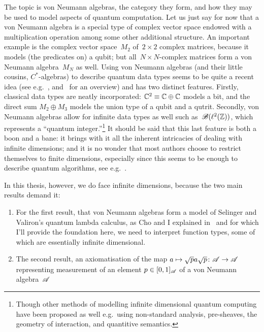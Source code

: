 \documentclass[b5paper]{book}
\begin{document}
\begin{parsec}{10}
\begin{point}{10}
The topic is von Neumann algebras,
the category they form,
and how they may be used
to model aspects of quantum computation.
Let us just say for now that a von Neumann algebra
is a special type of complex vector
space endowed with
a multiplication operation among some other additional structure.
An important example is the complex vector space~$M_2$
of~$2\times 2$ complex matrices,
because it models (the predicates on) a qubit;
but all~$N\times N$-complex matrices form a von Neumann algebra~$M_N$ as well.
Using von Neumann algebras
(and their little cousins, $C^*$-algebras) 
to describe quantum data types 
seems to be quite a recent idea
(see e.g.~\cite{jacobs2013block,rennela2015operator,furber2013kleisli}, 
	and~\cite{cho2016semantics} for an overview)
and has two distinct features.
Firstly, classical data types
are neatly incorporated:
$\mathbb{C}^2 \equiv \mathbb{C}\oplus \mathbb{C}$
models a bit,
and the direct sum $M_2\oplus M_3$
models the union type of a qubit and a qutrit.
Secondly,
von Neumann algebras
allow for infinite data types as well
	such as~$\mathscr{B}(\ell^2(\mathbb{Z}))$,
which represents a ``quantum integer.''\footnote{Though
	other methods of modelling infinite dimensional
	quantum computing have been proposed as well
	e.g.~using non-standard analysis\cite{Gogioso2017},
	pre-sheaves\cite{malherbe2013categorical},
	the geometry of interaction\cite{hasuo2017semantics},
	and quantitive semantics\cite{pagani2014applying}.}
It should be said that this last feature
is both a boon and a bane:
it brings with it all the inherent
intricacies of dealing with infinite dimensions;
and it is no wonder that
most authors choose 
to restrict themselves
to finite dimensions,
especially since
this seems to be enough to describe quantum algorithms,
see e.g.~\cite{nielsen2002quantum}.
\end{point}
\begin{point}{20}%
In this thesis, however,
we do face infinite dimensions,
because the two main results demand it:
\begin{enumerate}
\item
For the first result,
that von Neumann algebras
form  a model of Selinger and Valiron's quantum lambda calculus,
		as Cho and I explained in~\cite{model}
and for which I'll provide the foundation here,
we need to interpret function types,
some of which are essentially infinite dimensional.
\item
The second result,
an axiomatisation
of the map $a\mapsto \sqrt{p}a\sqrt{p}\colon \mathscr{A}\to\mathscr{A}$
representing measurement
of an element $p\in[0,1]_{\mathscr{A}}$
of a von Neumann algebra~$\mathscr{A}$

\end{enumerate}
\end{point}
\end{parsec}
\end{document}
